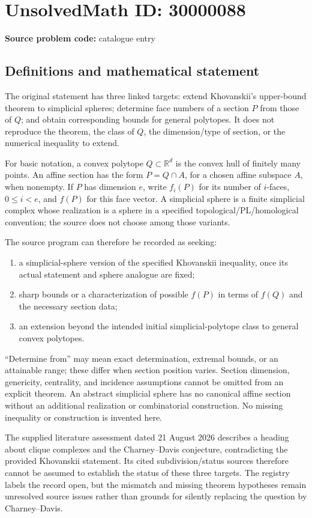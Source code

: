\documentclass[11pt]{article}
\newcommand{\R}{\mathbb{R}}
\begin{document}
\section*{UnsolvedMath ID: 30000088}
\textbf{Source problem code:} catalogue entry
\subsection{Definitions and mathematical statement}
The original statement has three linked targets: extend Khovanskii's upper-bound theorem to simplicial spheres; determine face numbers of a section \(P\) from those of \(Q\); and obtain corresponding bounds for general polytopes. It does not reproduce the theorem, the class of \(Q\), the dimension/type of section, or the numerical inequality to extend.

For basic notation, a convex polytope \(Q\subset\R^d\) is the convex hull of finitely many points. An affine section has the form \(P=Q\cap A\), for a chosen affine subspace \(A\), when nonempty. If \(P\) has dimension \(e\), write \(f_i(P)\) for its number of \(i\)-faces, \(0\leq i<e\), and \(f(P)\) for this face vector. A simplicial sphere is a finite simplicial complex whose realization is a sphere in a specified topological/PL/homological convention; the source does not choose among those variants.

The source program can therefore be recorded as seeking:
\begin{enumerate}
\item a simplicial-sphere version of the specified Khovanskii inequality, once its actual statement and sphere analogue are fixed;
\item sharp bounds or a characterization of possible \(f(P)\) in terms of \(f(Q)\) and the necessary section data;
\item an extension beyond the intended initial simplicial-polytope class to general convex polytopes.
\end{enumerate}
``Determine from'' may mean exact determination, extremal bounds, or an attainable range; these differ when section position varies. Section dimension, genericity, centrality, and incidence assumptions cannot be omitted from an explicit theorem. An abstract simplicial sphere has no canonical affine section without an additional realization or combinatorial construction. No missing inequality or construction is invented here.

The supplied literature assessment dated 21 August 2026 describes a heading about clique complexes and the Charney--Davis conjecture, contradicting the provided Khovanskii statement. Its cited subdivision/status sources therefore cannot be assumed to establish the status of these three targets. The registry labels the record open, but the mismatch and missing theorem hypotheses remain unresolved source issues rather than grounds for silently replacing the question by Charney--Davis.
\end{document}
